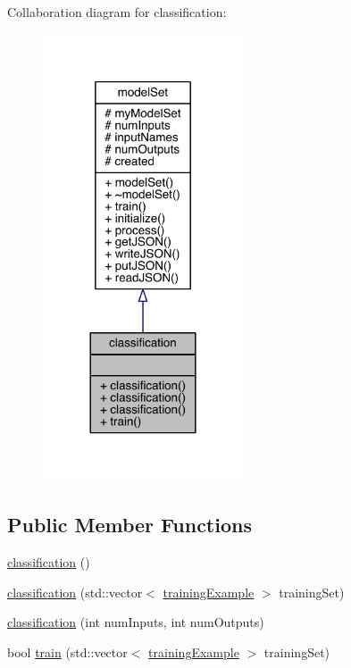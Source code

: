 Collaboration diagram for classification\+:
\nopagebreak
\begin{figure}[H]
\begin{center}
\leavevmode
\includegraphics[width=168pt]{classclassification__coll__graph}
\end{center}
\end{figure}
\subsection*{Public Member Functions}
\begin{DoxyCompactItemize}
\item 
\hyperlink{classclassification_a96cfefed3bbc9b8b61a44b9c6cc9e29a}{classification} ()
\item 
\hyperlink{classclassification_a825ef0d6ba9ba826d22969be72a9011f}{classification} (std\+::vector$<$ \hyperlink{structtraining_example}{training\+Example} $>$ training\+Set)
\item 
\hyperlink{classclassification_ab76d1e8c617be54ede9ea47dd3c128bf}{classification} (int num\+Inputs, int num\+Outputs)
\item 
bool \hyperlink{classclassification_a8e834c25309bc471c5bb8e8730874c82}{train} (std\+::vector$<$ \hyperlink{structtraining_example}{training\+Example} $>$ training\+Set)
\end{DoxyCompactItemize}
